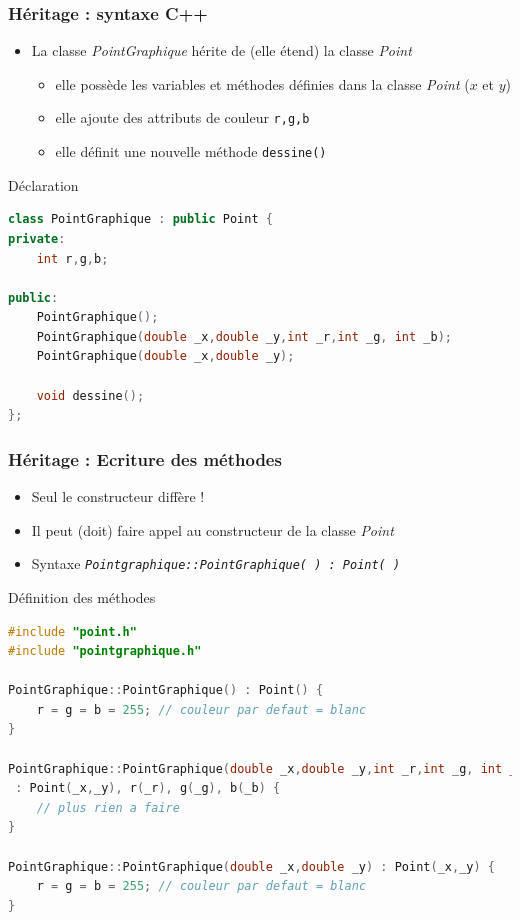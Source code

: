 \begin{frame}[fragile]
\frametitle{Héritage : syntaxe C++}
\begin{itemize}
	\item La classe \emph{PointGraphique} hérite de (elle étend) la classe \emph{Point}
	\begin{itemize}
		\item elle possède les variables et méthodes définies dans la classe \emph{Point} ($x$ et $y$)
		\item elle ajoute des attributs de couleur \texttt{r,g,b}
		\item elle définit une nouvelle méthode \texttt{dessine()}
	\end{itemize}
\end{itemize}
\begin{exampleblock}{Déclaration}
\begin{lstlisting}[language=C++]
class PointGraphique : public Point {
private:
    int r,g,b;

public:
    PointGraphique();
    PointGraphique(double _x,double _y,int _r,int _g, int _b);
    PointGraphique(double _x,double _y);

    void dessine();
};
\end{lstlisting}
\end{exampleblock}
\end{frame}

\begin{frame}[fragile]
\frametitle{Héritage : Ecriture des méthodes}
\begin{itemize}
	\item Seul le constructeur diffère !
	\item Il peut (doit) faire appel au constructeur de la classe \textit{Point}
	\item Syntaxe \texttt{\textit{Pointgraphique::PointGraphique( ) : Point( )}}
\end{itemize}
\begin{exampleblock}{Définition des méthodes}
\begin{lstlisting}[language=C++]
#include "point.h"
#include "pointgraphique.h"

PointGraphique::PointGraphique() : Point() {
    r = g = b = 255; // couleur par defaut = blanc
}

PointGraphique::PointGraphique(double _x,double _y,int _r,int _g, int _b)
 : Point(_x,_y), r(_r), g(_g), b(_b) {
    // plus rien a faire
}

PointGraphique::PointGraphique(double _x,double _y) : Point(_x,_y) {
    r = g = b = 255; // couleur par defaut = blanc
}
\end{lstlisting}
\end{exampleblock}
\end{frame}

